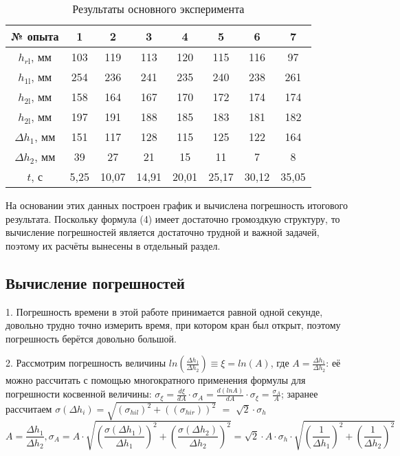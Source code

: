 \documentclass[a4paper,14pt]{article}
\begin{document}
\begin{table}[h]
\caption{Результаты основного эксперимента}
\label{}
\begin{tabular}{|c|c|c|c|c|c|c|c|}
\hline
№ опыта & 1 & 2     & 3     & 4     & 5     & 6     & 7     \\ \hline
$h_{r\text{l}}$, мм & 103                      & 119   & 113   & 120   & 115   & 116   & 97    \\ \hline
$h_{1\text{l}}$, мм & 254                      & 236   & 241   & 235   & 240   & 238   & 261   \\ \hline
$h_{2\text{l}}$, мм & 158                      & 164   & 167   & 170   & 172   & 174   & 174   \\ \hline
$h_{2\text{l}}$, мм & 197                      & 191   & 188   & 185   & 183   & 181   & 182   \\ \hline
$\Delta h_1$, мм & 151                      & 117   & 128   & 115   & 125   & 122   & 164   \\ \hline
$\Delta h_2$, мм & 39                       & 27    & 21    & 15    & 11    & 7     & 8     \\ \hline
$t$, с    & 5,25                     & 10,07 & 14,91 & 20,01 & 25,17 & 30,12 & 35,05 \\ \hline
\end{tabular}
\end{table}

На основании этих данных построен график и вычислена погрешность итогового результата. Поскольку формула (4) имеет достаточно громоздкую структуру, то вычисление погрешностей является достаточно трудной и важной задачей, поэтому их расчёты вынесены в отдельный раздел.

\subsection{Вычисление погрешностей}

1. Погрешность времени в этой работе принимается равной одной секунде, довольно трудно точно измерить время, при котором кран был открыт, поэтому погрешность берётся довольно большой.

2. Рассмотрим погрешность величины $ln\left(\frac{\Delta h_1}{\Delta h_2}\right) \equiv \xi = ln(A)$, где $A = \frac{\Delta h_1}{\Delta h_2}$: её можно рассчитать с помощью многократного применения формулы для погрешности косвенной величины: $\sigma_{\xi} = \frac{d \xi}{dA} \cdot \sigma_{A} = \frac{d(lnA)}{dA} \cdot \sigma_{\xi} = \frac{\sigma_A}{A}$; заранее рассчитаем $\sigma(\Delta h_i) = \sqrt{(\sigma_{hil})^2 + ((\sigma_{hir}))^2}$ $=$ $\sqrt{2} \cdot \sigma_h$
 \begin{equation}
A = \frac{\Delta h_1}{\Delta h_2}, \sigma_A = A \cdot \sqrt{\left(\frac{\sigma(\Delta h_1)}{\Delta h_1}\right)^2 + \left(\frac{\sigma(\Delta h_2)}{\Delta h_2}\right)^2} = \sqrt{2} \cdot A \cdot \sigma_h \cdot \sqrt{\left(\frac{1}{\Delta h_1}\right)^2 + \left(\frac{1}{\Delta h_2}\right)^2}
\end{equation} 
\end{document}

